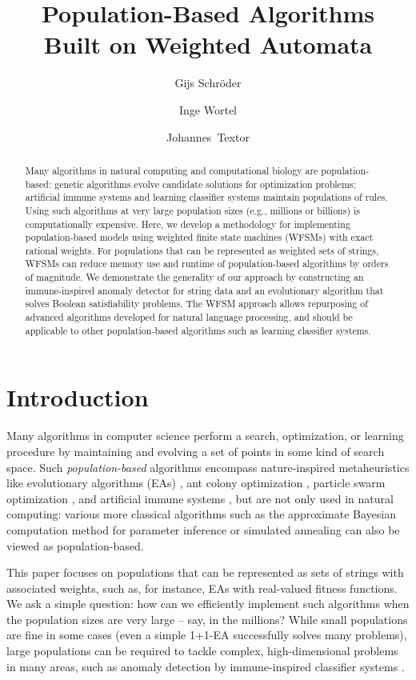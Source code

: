 \documentclass{llncs}
\title{Population-Based Algorithms \\
 Built on Weighted Automata}
\author{Gijs Schr\"oder\inst{1}\orcidID{0000-0001-6803-3237} \and Inge Wortel\inst{1}\orcidID{0000-0003-3362-5229}  \and Johannes~Textor\inst{1}\orcidID{0000-0002-0459-9458}}
\institute{Institute for Computing and Information Sciences, \\ Radboud University, 
Nijmegen, The Netherlands \\ \email{\{gijs.schroeder,inge.wortel,johannes.textor\}@ru.nl} }
\begin{document}
\maketitle

\begin{abstract}

  Many algorithms in natural computing and computational biology are
population-based: genetic algorithms evolve candidate solutions for
optimization problems; artificial immune systems and learning classifier
systems maintain populations of rules. Using such algorithms at very large
population sizes (e.g., millions or billions) is computationally
expensive.  Here, we develop a methodology for implementing population-based
models using  weighted finite state machines (WFSMs) with exact rational
weights.  For populations that can be represented as weighted sets of strings,
WFSMs can reduce memory use and runtime of population-based algorithms by
orders of magnitude.  We demonstrate the generality of our approach by
constructing an immune-inspired anomaly detector for string data and an
evolutionary algorithm that solves Boolean satisfiability problems.  The WFSM
approach allows repurposing of advanced algorithms developed for natural
language processing, and should be applicable to other population-based
algorithms such as learning classifier systems.

\end{abstract}


\section{Introduction}

Many algorithms in computer science perform a search, optimization, or learning procedure by maintaining and evolving a set of points in some kind of search space. Such \emph{population-based} algorithms \cite{Blum_2003} encompass nature-inspired metaheuristics like evolutionary algorithms (EAs) \cite{Jansen2013}, ant colony optimization \cite{Blum2005}, particle swarm optimization \cite{Gad2022}, and artificial immune systems \cite{Timmis2004}, but are not only used in natural computing: various more classical algorithms such as the approximate Bayesian computation method for parameter inference \cite{Sisson2007} %
or simulated annealing can also be viewed as population-based.

This paper focuses on populations that can be represented as sets of strings with associated weights, such as, for instance, EAs with real-valued fitness functions. We ask a simple question: how can we efficiently implement such algorithms when the population sizes are very large -- say, in the millions? While small populations are fine in some cases (even a simple 1+1-EA  successfully solves many problems), large populations can be required to tackle complex, high-dimensional problems in many areas, such as anomaly detection by immune-inspired classifier systems \cite{Stibor2005}. 
\end{document}
